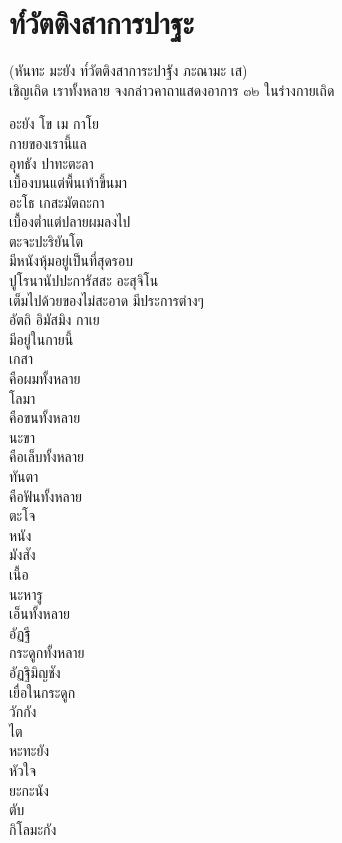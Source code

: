 \documentclass{article}
\begin{document}
\pagebreak
\section{ท๎วัตติงสาการปาฐะ}
\begin{center}
(หันทะ มะยัง ท๎วัตติงสาการะปาฐัง ภะณามะ เส)\\
เชิญเถิด เราทั้งหลาย จงกล่าวคาถาแสดงอาการ ๓๒ ในร่างกายเถิด
\end{center}
อะยัง โข เม กาโย\\
\indent กายของเรานี้แล\\
อุทธัง ปาทะตะลา\\
\indent เบื้องบนแต่พื้นเท้าขึ้นมา\\
อะโธ เกสะมัตถะกา\\
\indent เบื้องต่ำแต่ปลายผมลงไป\\
ตะจะปะริยันโต\\
\indent มีหนังหุ้มอยู่เป็นที่สุดรอบ\\
ปูโรนานัปปะการัสสะ อะสุจิโน\\
\indent เต็มไปด้วยของไม่สะอาด มีประการต่างๆ\\
อัตถิ อิมัสมิง กาเย \\
\indent มีอยู่ในกายนี้\\
เกสา \\
\indent คือผมทั้งหลาย\\
โลมา \\
\indent คือขนทั้งหลาย\\
นะขา \\
\indent คือเล็บทั้งหลาย\\
ทันตา \\
\indent คือฟันทั้งหลาย\\
ตะโจ \\
\indent หนัง\\
มังสัง \\
\indent เนื้อ\\
นะหารู \\
\indent เอ็นทั้งหลาย\\
อัฏฐี \\
\indent กระดูกทั้งหลาย\\
อัฏฐิมิญชัง \\
\indent เยื่อในกระดูก\\
วักกัง \\
\indent ไต\\
หะทะยัง \\
\indent หัวใจ\\
ยะกะนัง \\
\indent ตับ\\
กิโลมะกัง \\
\end{document}

